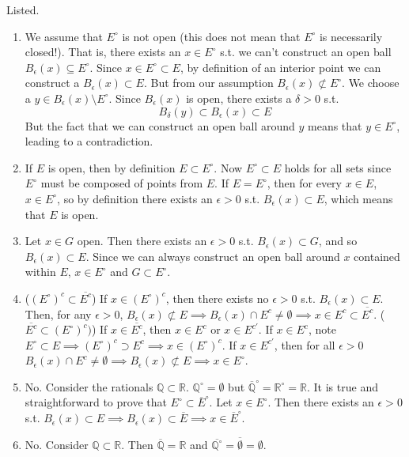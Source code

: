 \documentclass{article}
\begin{document}
    \begin{solution}
    Listed. 
    \begin{enumerate}
        \item We assume that $E^\circ$ is not open (this does not mean that $E^\circ$ is necessarily closed!). That is, there exists an $x \in E^\circ $ s.t. we can't construct an open ball $B_\epsilon (x) \subseteq E^\circ$. Since $x \in E^\circ \subset E$, by definition of an interior point we can construct a $B_\epsilon (x) \subset E$. But from our assumption $B_\epsilon (x) \not\subset E^\circ$. We choose a $y \in B_\epsilon (x) \setminus E^\circ$. Since $B_\epsilon (x)$ is open, there exists a $\delta > 0$ s.t. 
        \[B_\delta (y) \subset B_\epsilon (x) \subset E\]
        But the fact that we can construct an open ball around $y$ means that $y \in E^\circ$, leading to a contradiction. 

        \item If $E$ is open, then by definition $E \subset E^\circ$. Now $E^\circ \subset E$ holds for all sets since $E^\circ$ must be composed of points from $E$. If $E = E^\circ$, then for every $x \in E$, $x \in E^\circ$, so by definition there exists an $\epsilon > 0$ s.t. $B_\epsilon (x) \subset E$, which means that $E$ is open. 

        \item Let $x \in G$ open. Then there exists an $\epsilon > 0$ s.t. $B_\epsilon (x) \subset G$, and so $B_\epsilon (x) \subset E$. Since we can always construct an open ball around $x$ contained within $E$, $x \in E^\circ$ and $G \subset E^\circ$. 

        \item ($(E^\circ)^c \subset \overline{E^c}$) If $x \in (E^\circ)^c$, then there exists no $\epsilon > 0$ s.t. $B_\epsilon (x) \subset E$. Then, for any $\epsilon > 0$, $B_\epsilon (x) \not\subset E \implies B_\epsilon (x) \cap E^c \neq \emptyset \implies x \in E^c \subset \overline{E^c}$. ($\overline{E^c} \subset (E^\circ)^c)$) If $x \in \overline{E^c}$, then $x \in E^c$ or $x \in E^{c \prime}$. If $x \in E^c$, note $E^\circ \subset E \implies (E^\circ)^c \supset E^c \implies x \in (E^\circ)^c$. If $x \in E^{c \prime}$, then for all $\epsilon > 0$ $B_\epsilon (x) \cap E^c \neq \emptyset \implies B_\epsilon (x) \not\subset E \implies x \in E^\circ$. 

        \item No. Consider the rationals $\mathbb{Q} \subset \mathbb{R}$. $\mathbb{Q}^\circ = \emptyset$ but $\overline{\mathbb{Q}}^\circ = \mathbb{R}^\circ = \mathbb{R}$. It is true and straightforward to prove that $E^\circ \subset \overline{E}^\circ$.  Let $x \in E^\circ$. Then there exists an $\epsilon > 0$ s.t. $B_\epsilon(x) \subset E \implies B_\epsilon (x) \subset \overline{E} \implies x \in \overline{E}^\circ$. 

        \item No. Consider $\mathbb{Q} \subset \mathbb{R}$. Then $\overline{\mathbb{Q}} = \mathbb{R}$ and $\overline{\mathbb{Q}^\circ} = \overline{\emptyset} = \emptyset$.  
    \end{enumerate}
    \end{solution}
\end{document}
